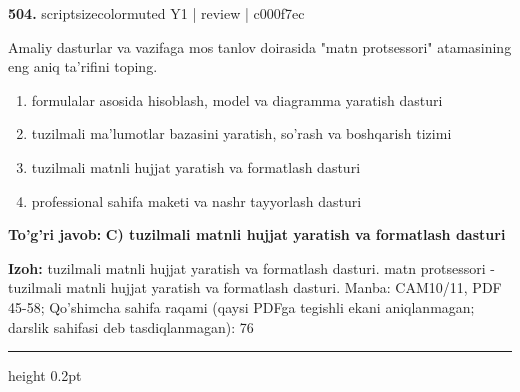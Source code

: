 \documentclass[10pt,a4paper]{article}
\begin{document}
{\bfseries\sffamily\color{ink} 504.} {scriptsizecolor{muted} Y1 | review | c000f7ec}
\par
Amaliy dasturlar va vazifaga mos tanlov doirasida "matn protsessori" atamasining eng aniq ta'rifini toping.
\begin{enumerate}[label=\Alph*),leftmargin=9mm]
\item formulalar asosida hisoblash, model va diagramma yaratish dasturi
\item tuzilmali ma'lumotlar bazasini yaratish, so'rash va boshqarish tizimi
\item tuzilmali matnli hujjat yaratish va formatlash dasturi
\item professional sahifa maketi va nashr tayyorlash dasturi
\end{enumerate}
\begin{tcolorbox}[enhanced,breakable,colback=teal!4,colframe=teal!60!black,boxrule=0.45pt,arc=1.2mm,left=2.7mm,right=2.7mm,top=1.8mm,bottom=1.8mm,before skip=2mm,after skip=2mm]
{\bfseries\sffamily\color{teal}To'g'ri javob:} \textbf{C) tuzilmali matnli hujjat yaratish va formatlash dasturi}
\par\smallskip
{\bfseries Izoh:} tuzilmali matnli hujjat yaratish va formatlash dasturi. matn protsessori - tuzilmali matnli hujjat yaratish va formatlash dasturi. Manba: CAM10/11, PDF 45-58; Qo'shimcha sahifa raqami (qaysi PDFga tegishli ekani aniqlanmagan; darslik sahifasi deb tasdiqlanmagan): 76
\end{tcolorbox}
\vspace{2mm}\hrule height 0.2pt\vspace{3mm}
\end{document}
